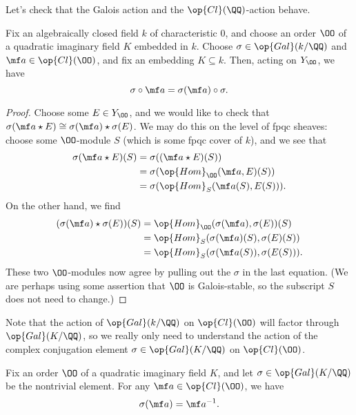 \documentclass[../notes.tex]{subfiles}
\begin{document}
Let's check that the Galois action and the $\op{Cl}(\QQ)$-action behave.
\begin{lemma} \label{lem:galois-and-cl-action-commute}
	Fix an algebraically closed field $k$ of characteristic $0$, and choose an order $\OO$ of a quad\-ratic imaginary field $K$ embedded in $k$. Choose $\sigma\in\op{Gal}(k/\QQ)$ and $\mf a\in\op{Cl}(\OO)$, and fix an embedding $K\subseteq k$. Then, acting on $Y_\OO$, we have
	\[\sigma\circ\mf a=\sigma(\mf a)\circ\sigma.\]
\end{lemma}
\begin{proof}
	Choose some $E\in Y_\OO$, and we would like to check that $\sigma(\mf a\star E)\cong\sigma(\mf a)\star\sigma(E)$. We may do this on the level of fpqc sheaves: choose some $\OO$-module $S$ (which is some fpqc cover of $k$), and we see that
	\begin{align*}
		\sigma(\mf a\star E)(S) &= \sigma((\mf a\star E)(S)) \\
		&= \sigma(\op{Hom}_\OO(\mf a,E)(S)) \\
		&= \sigma(\op{Hom}_S(\mf a(S),E(S))).
	\end{align*}
	On the other hand, we find
	\begin{align*}
		(\sigma(\mf a)\star\sigma(E))(S) &= \op{Hom}_\OO(\sigma(\mf a),\sigma(E))(S) \\
		&= \op{Hom}_S(\sigma(\mf a)(S),\sigma(E)(S)) \\
		&= \op{Hom}_S(\sigma(\mf a(S)),\sigma(E(S))).
	\end{align*}
	These two $\OO$-modules now agree by pulling out the $\sigma$ in the last equation. (We are perhaps using some assertion that $\OO$ is Galois-stable, so the subscript $S$ does not need to change.)
\end{proof}
Note that the action of $\op{Gal}(k/\QQ)$ on $\op{Cl}(\OO)$ will factor through $\op{Gal}(K/\QQ)$, so we really only need to understand the action of the complex conjugation element $\sigma\in\op{Gal}(K/\QQ)$ on $\op{Cl}(\OO)$.
\begin{lemma} \label{lem:galois-action-on-cl}
	Fix an order $\OO$ of a quadratic imaginary field $K$, and let $\sigma\in\op{Gal}(K/\QQ)$ be the nontrivial element. For any $\mf a\in\op{Cl}(\OO)$, we have
	\[\sigma(\mf a)=\mf a^{-1}.\]
\end{lemma}
\end{document}
